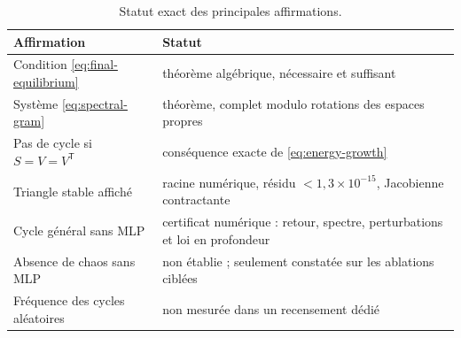 \documentclass[11pt,a4paper]{article}
\theoremstyle{definition}
\newcommand{\T}{\mathsf T}
\begin{document}
\begin{table}[ht]
\centering
\caption{Statut exact des principales affirmations.}
\begin{tabularx}{\textwidth}{@{}lX@{}}
\toprule
Affirmation & Statut \\
\midrule
Condition \eqref{eq:final-equilibrium} & théorème algébrique, nécessaire et suffisant \\
Système \eqref{eq:spectral-gram} & théorème, complet modulo rotations des espaces propres \\
Pas de cycle si $S=V=V^{\T}$ & conséquence exacte de \eqref{eq:energy-growth} \\
Triangle stable affiché & racine numérique, résidu $<1{,}3\times10^{-15}$, Jacobienne contractante \\
Cycle général sans MLP & certificat numérique : retour, spectre, perturbations et loi en profondeur \\
Absence de chaos sans MLP & non établie ; seulement constatée sur les ablations ciblées \\
Fréquence des cycles aléatoires & non mesurée dans un recensement dédié \\
\bottomrule
\end{tabularx}
\end{table}


{\small}
\end{document}
